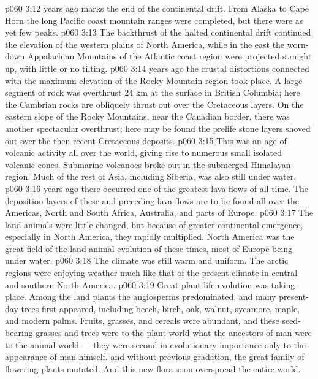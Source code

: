 \vs p060 3:12 \pc {} years ago marks the end of the continental drift. From Alaska to Cape Horn the long Pacific coast mountain ranges were completed, but there were as yet few peaks.
\vs p060 3:13 The backthrust of the halted continental drift continued the elevation of the western plains of North America, while in the east the worn\hyp{}down Appalachian Mountains of the Atlantic coast region were projected straight up, with little or no tilting.
\vs p060 3:14 \pc {} years ago the crustal distortions connected with the maximum elevation of the Rocky Mountain region took place. A large segment of rock was overthrust 24 km at the surface in British Columbia; here the Cambrian rocks are obliquely thrust out over the Cretaceous layers. On the eastern slope of the Rocky Mountains, near the Canadian border, there was another spectacular overthrust; here may be found the prelife stone layers shoved out over the then recent Cretaceous deposits.
\vs p060 3:15 This was an age of volcanic activity all over the world, giving rise to numerous small isolated volcanic cones. Submarine volcanoes broke out in the submerged Himalayan region. Much of the rest of Asia, including Siberia, was also still under water.
\vs p060 3:16 \pc {} years ago there occurred one of the greatest lava flows of all time. The deposition layers of these and preceding lava flows are to be found all over the Americas, North and South Africa, Australia, and parts of Europe.
\vs p060 3:17 The land animals were little changed, but because of greater continental emergence, especially in North America, they rapidly multiplied. North America was the great field of the land\hyp{}animal evolution of these times, most of Europe being under water.
\vs p060 3:18 The climate was still warm and uniform. The arctic regions were enjoying weather much like that of the present climate in central and southern North America.
\vs p060 3:19 Great plant\hyp{}life evolution was taking place. Among the land plants the angiosperms predominated, and many present\hyp{}day trees first appeared, including beech, birch, oak, walnut, sycamore, maple, and modern palms. Fruits, grasses, and cereals were abundant, and these seed\hyp{}bearing grasses and trees were to the plant world what the ancestors of man were to the animal world --- they were second in evolutionary importance only to the appearance of man himself.  and without previous gradation, the great family of flowering plants mutated. And this new flora soon overspread the entire world.
